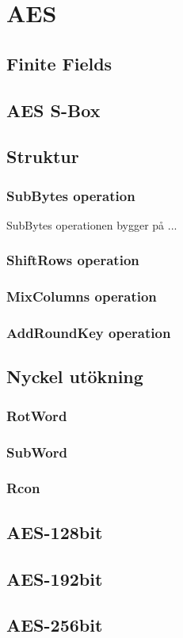 
\section{AES}


\subsection{Finite Fields}


\subsection{AES S-Box}


\subsection{Struktur}


\subsubsection{SubBytes operation}
SubBytes operationen bygger på ...

\subsubsection{ShiftRows operation}


\subsubsection{MixColumns operation}


\subsubsection{AddRoundKey operation}


\subsection{Nyckel utökning}


\subsubsection{RotWord}


\subsubsection{SubWord}


\subsubsection{Rcon}


\subsection{AES-128bit}


\subsection{AES-192bit}


\subsection{AES-256bit}

